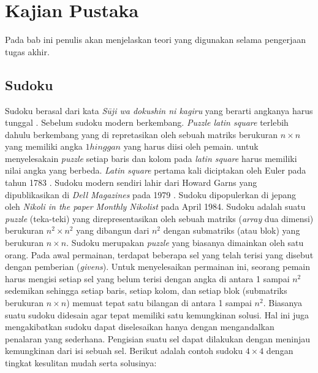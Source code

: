 \chapter{Kajian Pustaka}

Pada bab ini penulis akan menjelaskan teori yang digunakan selama pengerjaan tugas akhir.

\section{Sudoku}

Sudoku berasal dari kata \textit{Sūji wa dokushin ni kagiru} yang berarti angkanya harus tunggal \cite{SATPy3}. Sebelum sudoku modern berkembang. \textit{Puzzle latin square} terlebih dahulu berkembang yang di repretasikan oleh sebuah matriks berukuran ${n \times n}$ yang memiliki angka ${1 hingga n}$ yang harus diisi oleh pemain. untuk menyelesakain \textit{puzzle }setiap baris dan kolom pada \textit{latin square} harus memiliki nilai angka yang berbeda. \textit{Latin square} pertama kali diciptakan oleh Euler pada tahun 1783 \cite{Unk1}. Sudoku modern sendiri lahir dari  Howard Garns yang dipublikasikan di \textit{Dell Magazines} pada 1979 \cite{SATPy5}. Sudoku dipopulerkan di jepang oleh \textit{Nikoli in the paper Monthly Nikolist} pada April 1984. Sudoku adalah suatu \textit{puzzle} (teka-teki) yang direpresentasikan oleh sebuah matriks (\textit{array}
dua dimensi) berukuran ${n^2 \times n^2}$  yang dibangun dari ${n^2}$ dengan submatriks (atau blok)
yang berukuran ${n \times n}$. Sudoku merupakan \textit{puzzle}
yang biasanya dimainkan oleh satu orang.  Pada
awal permainan, terdapat beberapa sel yang telah terisi yang disebut dengan pemberian
(\textit{givens}). Untuk menyelesaikan permainan ini, seorang pemain harus mengisi setiap sel yang
belum terisi dengan angka di antara 1 sampai
$n^2$ sedemikan sehingga setiap baris, setiap kolom,
dan setiap blok (submatriks berukuran $n \times n$) memuat tepat satu bilangan di antara 1 sampai $n^2$. Biasanya suatu sudoku didesain agar tepat memiliki satu kemungkinan solusi. Hal
ini juga mengakibatkan sudoku dapat diselesaikan hanya dengan mengandalkan penalaran
yang sederhana. Pengisian suatu sel dapat dilakukan dengan meninjau kemungkinan dari
isi sebuah sel. Berikut adalah contoh sudoku $4 \times 4$ dengan tingkat kesulitan mudah serta solusinya:

